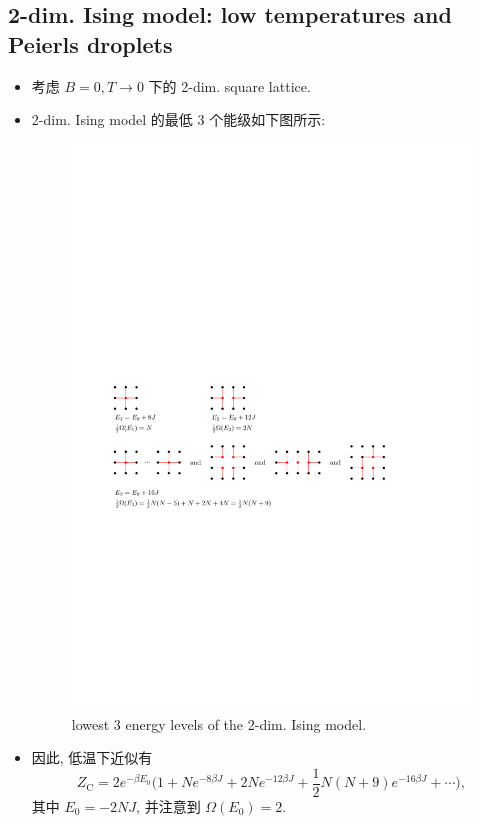 \subsection{2-dim. Ising model: low temperatures and Peierls droplets}
\begin{itemize}
	\item 考虑 $B = 0, T \rightarrow 0$ 下的 2-dim. square lattice.
	
	\item 2-dim. Ising model 的最低 3 个能级如下图所示:
	
	\begin{figure}[H]
		\centering
		\includegraphics[scale=1]{figures/lowest 3 energy levels of the 2-dim. Ising model.pdf}
		\caption{lowest 3 energy levels of the 2-dim. Ising model.}
	\end{figure}
	
	\item 因此, 低温下近似有
	\begin{equation} \label{11.4.10}
		Z_\text{C} = 2 e^{- \beta E_0} \Big( 1 + N e^{- 8 \beta J} + 2 N e^{- 12 \beta J} + \frac{1}{2} N (N + 9) e^{- 16 \beta J} + \cdots \Big),
	\end{equation}
	其中 $E_0 = - 2 N J$, 并注意到 $\Omega(E_0) = 2$.
	

\end{itemize}
